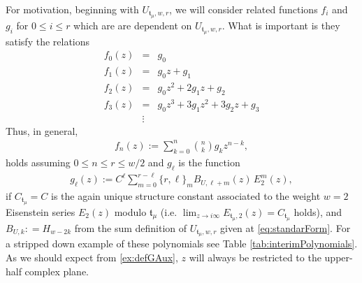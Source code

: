 \documentclass[11pt]{article}
\begin{document}
  


For motivation, beginning with $ U_{\mathfrak{t}_\mu, w,r} $, we will consider related functions $ f_i $ and $ g_i $ for $ 0\leq i \leq r $ which are are dependent on $ U_{\mathfrak{t}_\mu, w,r} $. What is important is they satisfy the relations
    \begin{eqnarray*}
        f_0(z) &=& g_0 \\
        f_1(z) &=& g_0z + g_1  \\
        f_2(z) &=& g_0z^2 + 2g_1z + g_2  \\
        f_3(z) &=& g_0z^3 + 3g_1z^2 + 3g_2z + g_3  \\
        & \vdots & 
    \end{eqnarray*}
Thus, in general,
    \begin{eqnarray}\label{eq:defFAux}
        f_n(z) := \sum_{k=0}^n \binom{n}{k}g_{k}z^{n-k},
    \end{eqnarray}
holds assuming $ 0 \leq n \leq r\leq w/2 $ and $ g_{\ell} $ is the function
    \begin{eqnarray}\label{ex:defGAux}
        g_{\ell}(z) := C^\ell  \sum_{m=0}^{r-\ell}\{ r,\ell \}_m B_{U, \ell + m}(z)\, E_{2}^{m}(z),
    \end{eqnarray}
if $ C_{\mathfrak{t}_\mu} = C  $ is the again unique structure constant associated to the weight $ w =2 $ Eisenstein series $ E_{2}(z) $ modulo $ \mathfrak{t}_\mu $ (i.e. $ \lim_{z\rightarrow i\infty}E_{\mathfrak{t}_\mu, 2}(z) = C_{\mathfrak{t}_\mu} $
holds), and $  B_{U, k} : = H_{w-2k}  $ from the sum definition of $ U_{\mathfrak{t}_\mu, w,r} $ given at \eqref{eq:standarForm}. For a stripped down example of these polynomials see Table \ref{tab:interimPolynomials}. As we should expect from \eqref{ex:defGAux}, $ z $ will always be restricted to the upper-half complex plane. 
\end{document}
